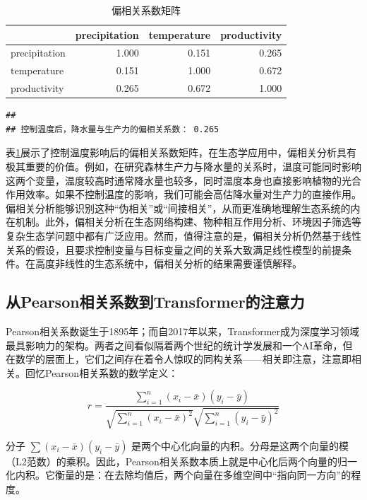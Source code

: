 \documentclass[
  twoside,12pt,fontset=none]{ctexbook}
\begin{document}
\begin{table}[!h]
\centering
\caption{\label{tab:partial-cor-table}偏相关系数矩阵}
\centering
\begin{tabular}[t]{lrrr}
\toprule
  & precipitation & temperature & productivity\\
\midrule
precipitation & 1.000 & 0.151 & 0.265\\
temperature & 0.151 & 1.000 & 0.672\\
productivity & 0.265 & 0.672 & 1.000\\
\bottomrule
\end{tabular}
\end{table}

\begin{verbatim}
## 
## 控制温度后，降水量与生产力的偏相关系数： 0.265
\end{verbatim}

表\ref{tab:partial-cor-table}展示了控制温度影响后的偏相关系数矩阵，在生态学应用中，偏相关分析具有极其重要的价值。例如，在研究森林生产力与降水量的关系时，温度可能同时影响这两个变量，温度较高时通常降水量也较多，同时温度本身也直接影响植物的光合作用效率。如果不控制温度的影响，我们可能会高估降水量对生产力的直接作用。偏相关分析能够识别这种``伪相关''或``间接相关''，从而更准确地理解生态系统的内在机制。此外，偏相关分析在生态网络构建、物种相互作用分析、环境因子筛选等复杂生态学问题中都有广泛应用。然而，值得注意的是，偏相关分析仍然基于线性关系的假设，且要求控制变量与目标变量之间的关系大致满足线性模型的前提条件。在高度非线性的生态系统中，偏相关分析的结果需要谨慎解释。

\hypertarget{ux4ecepearsonux76f8ux5173ux7cfbux6570ux5230transformerux7684ux6ce8ux610fux529b}{%
\subsection{从Pearson相关系数到Transformer的注意力}\label{ux4ecepearsonux76f8ux5173ux7cfbux6570ux5230transformerux7684ux6ce8ux610fux529b}}

Pearson相关系数诞生于1895年；而自2017年以来，Transformer成为深度学习领域最具影响力的架构。两者之间看似隔着两个世纪的统计学发展和一个AI革命，但在数学的层面上，它们之间存在着令人惊叹的同构关系------相关即注意，注意即相关。回忆Pearson相关系数的数学定义：

\[r = \frac{\sum_{i=1}^{n} (x_i - \bar{x})(y_i - \bar{y})}{\sqrt{\sum_{i=1}^{n} (x_i - \bar{x})^2} \sqrt{\sum_{i=1}^{n} (y_i - \bar{y})^2}}\]

分子 \(\sum (x_i - \bar{x})(y_i - \bar{y})\) 是两个中心化向量的内积。分母是这两个向量的模（L2范数）的乘积。因此，Pearson相关系数本质上就是中心化后两个向量的归一化内积。它衡量的是：在去除均值后，两个向量在多维空间中``指向同一方向''的程度。
\end{document}
